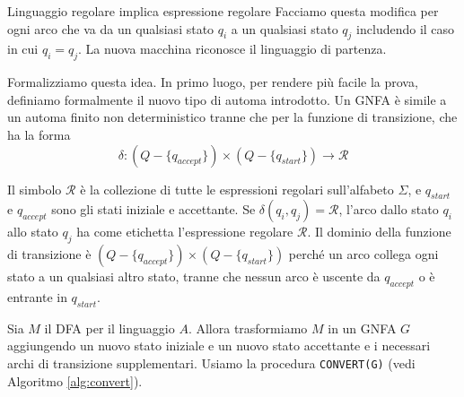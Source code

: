 \begin{Lemma}{Linguaggio regolare implica espressione regolare}{}
Facciamo questa modifica per ogni arco che va da un qualsiasi stato $q_{i}$ a un qualsiasi stato $q_{j}$ includendo il caso in cui $q_{i} = q_{j}$. La nuova macchina riconosce il linguaggio di partenza.

\begin{demonstration}
Formalizziamo questa idea. In primo luogo, per rendere più facile la prova, definiamo formalmente il nuovo tipo di automa introdotto. Un GNFA è simile a un automa finito non deterministico tranne che per la funzione di transizione, che ha la forma
\begin{equation*}
    \delta: (Q-\{q_{accept}\}) \times (Q-\{q_{start}\})\longrightarrow \mathcal{R}
\end{equation*}

Il simbolo $\mathcal{R}$ è la collezione di tutte le espressioni regolari sull'alfabeto $\Sigma$, e $q_{start}$ e $q_{accept}$ sono gli stati iniziale e accettante. Se $\delta (q_i, q_j) = \mathcal{R}$, l'arco dallo stato $q_i$ allo stato $q_j$ ha come etichetta l'espressione regolare $\mathcal{R}$. Il dominio della funzione di transizione è $(Q-\{q_{accept}\}) \times (Q-\{q_{start}\})$ perché un arco collega ogni stato a un qualsiasi altro stato, tranne che nessun arco è uscente da $q_{accept}$ o è entrante in $q_{start}$.

Sia $M$ il DFA per il linguaggio $A$. Allora trasformiamo $M$ in un GNFA $G$ aggiungendo un nuovo stato iniziale e un nuovo stato accettante e i necessari archi di transizione supplementari. Usiamo la procedura \texttt{CONVERT(G)} (vedi Algoritmo \ref{alg:convert}).
\end{demonstration}
\end{Lemma}

